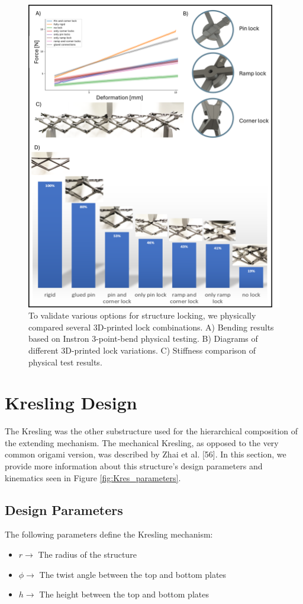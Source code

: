 \documentclass[11pt, a4paper]{article}
\begin{document}
\begin{figure}
\centering
\includegraphics[width=\linewidth]{figures-sup/locking.png}

\centering
\caption{To validate various options for structure locking, we physically compared several 3D-printed lock combinations. A) Bending results based on Instron 3-point-bend physical testing. B) Diagrams of different 3D-printed lock variations. C) Stiffness comparison of physical test results.}
\label{fig:locking}
\end{figure}

\section{Kresling Design}
The Kresling was the other substructure used for the hierarchical composition of the extending mechanism. The mechanical Kresling, as opposed to the very common origami version, was described by Zhai et al. [56]. In this section, we provide more information about this structure's design parameters and kinematics seen in Figure \ref{fig:Kres_parameters}. 
\subsection{Design Parameters}
The following parameters define the Kresling mechanism:
\begin{itemize}
    \item $r \rightarrow$ The radius of the structure
    \item $\phi \rightarrow$ The twist angle between the top and bottom plates
    \item $h \rightarrow$ The height between the top and bottom plates
\end{itemize}
\end{document}
